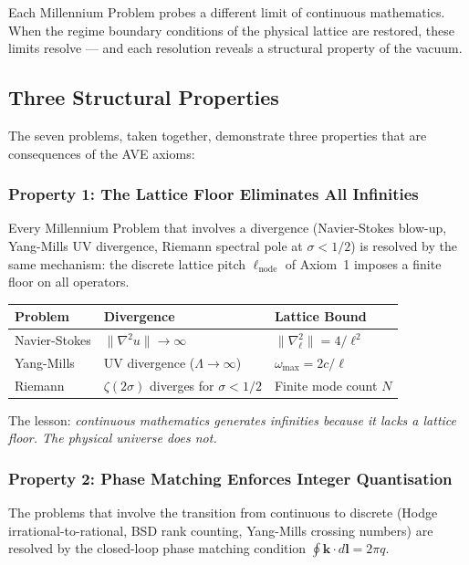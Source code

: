 Each Millennium Problem probes a different limit of continuous mathematics. When the regime boundary conditions of the physical lattice are restored, these limits resolve --- and each resolution reveals a structural property of the vacuum.

\subsection{Three Structural Properties}

The seven problems, taken together, demonstrate three properties that are consequences of the AVE axioms:

\subsubsection{Property 1: The Lattice Floor Eliminates All Infinities}

Every Millennium Problem that involves a divergence (Navier-Stokes blow-up, Yang-Mills UV divergence, Riemann spectral pole at $\sigma < 1/2$) is resolved by the same mechanism: the discrete lattice pitch $\ell_\mathrm{node}$ of Axiom~1 imposes a finite floor on all operators.

\begin{center}
\small
\begin{tabular}{lll}
\toprule
\textbf{Problem} & \textbf{Divergence} & \textbf{Lattice Bound} \\
\midrule
Navier-Stokes & $\|\nabla^2 u\| \to \infty$ & $\|\nabla^2_\ell\| = 4/\ell^2$ \\
Yang-Mills & UV divergence ($\Lambda \to \infty$) & $\omega_\mathrm{max} = 2c/\ell$ \\
Riemann & $\zeta(2\sigma)$ diverges for $\sigma < 1/2$ & Finite mode count $N$ \\
\bottomrule
\end{tabular}
\end{center}

The lesson: \textit{continuous mathematics generates infinities because it lacks a lattice floor. The physical universe does not.}

\subsubsection{Property 2: Phase Matching Enforces Integer Quantisation}

The problems that involve the transition from continuous to discrete (Hodge irrational-to-rational, BSD rank counting, Yang-Mills crossing numbers) are resolved by the closed-loop phase matching condition $\oint \mathbf{k} \cdot d\mathbf{l} = 2\pi q$.


